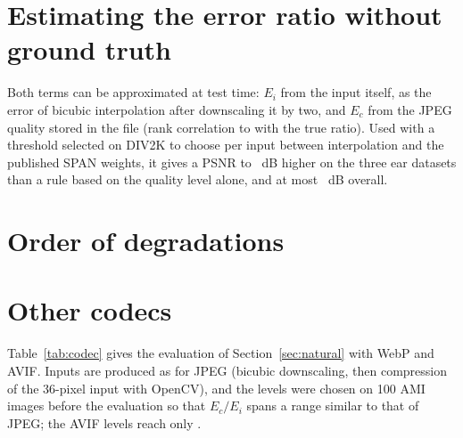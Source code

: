 \section{Estimating the error ratio without ground truth}
\label{app:selector}
Both terms can be approximated at test time: $E_i$ from the input itself, as the error of bicubic interpolation after downscaling it by two, and $E_c$ from the JPEG quality stored in the file (rank correlation \SelRhoMin{} to \SelRhoMax{} with the true ratio). Used with a threshold selected on DIV2K to choose per input between interpolation and the published SPAN weights, it gives a PSNR \SelCrossMin{} to \SelCrossMax{}~dB higher on the three ear datasets than a rule based on the quality level alone, and at most \SelGainMax{}~dB overall.

\section{Order of degradations}
\label{app:order}
\begin{table}[H]
\centering
\caption{Order of degradations on AMI (36-pixel inputs, \NAmiAllImg{} images for the published models). Bicubic: PSNR-Y of interpolation (dB). Published: median gain of the \NPub{} published models over interpolation and number of models below it. Ours: SPAN fine-tuned with the measured degradation minus interpolation and minus the published SPAN weights, pooled over the test subjects of the five folds, with 95\% confidence intervals. The offset is drawn per image from 1 to 7 input pixels in each direction; the image is padded by reflection, compressed and cropped back, so its size is unchanged.}
\label{tab:order}
\end{table}

\section{Other codecs}
\label{app:codec}
Table~\ref{tab:codec} gives the evaluation of Section~\ref{sec:natural} with WebP and AVIF. Inputs are produced as for JPEG (bicubic downscaling, then compression of the 36-pixel input with OpenCV), and the levels were chosen on 100 AMI images before the evaluation so that $E_c/E_i$ spans a range similar to that of JPEG; the AVIF levels reach only \CodecAvifRatioMax{}.


